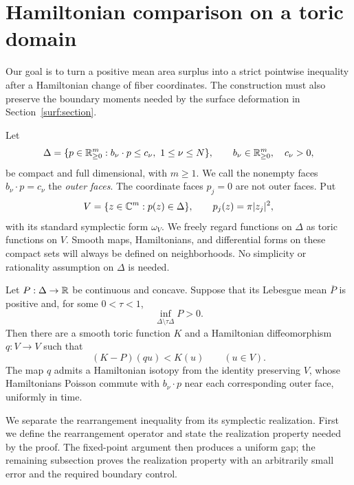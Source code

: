 \section{Hamiltonian comparison on a toric domain}\label{cmp:section}

Our goal is to turn a positive mean area surplus into a strict
pointwise inequality after a Hamiltonian change of fiber coordinates.
The construction must also preserve the boundary moments needed by
the surface deformation in Section~\ref{surf:section}.

Let
\begin{equation}\label{cmp:polytope}
 \Delta=\{p\in\mathbb R_{\ge0}^m:
             b_\nu\cdot p\le c_\nu,\ 1\le\nu\le N\},
 \qquad b_\nu\in\mathbb R_{\ge0}^m,\quad c_\nu>0,
\end{equation}
be compact and full dimensional, with \(m\ge1\).
We call the nonempty faces \(b_\nu\cdot p=c_\nu\) the
\emph{outer faces}. The coordinate faces \(p_j=0\) are not outer faces.
Put
\[
 V=\{z\in\mathbb C^m:p(z)\in\Delta\},\qquad
 p_j(z)=\pi|z_j|^2,
\]
with its standard symplectic form \(\omega_V\).
We freely regard functions on \(\Delta\) as toric functions on \(V\).
Smooth maps, Hamiltonians, and differential forms on these compact
sets will always be defined on neighborhoods. No simplicity or
rationality assumption on \(\Delta\) is needed.

\begin{lemma}\label{cmp:comparison}
Let \(P:\Delta\to\mathbb R\) be continuous and concave. Suppose that its
Lebesgue mean \(\overline P\) is positive and, for some \(0<\tau<1\),
\begin{equation}\label{cmp:outer-positive}
 \inf_{\Delta\setminus\tau\Delta}P>0.
\end{equation}
Then there are a smooth toric function \(K\) and a Hamiltonian
diffeomorphism \(q:V\to V\) such that
\begin{equation}\label{cmp:conclusion}
 (K-P)(qu)<K(u)\qquad(u\in V).
\end{equation}
The map \(q\) admits a Hamiltonian isotopy from the identity preserving
\(V\), whose Hamiltonians Poisson commute with \(b_\nu\cdot p\) near
each corresponding outer face, uniformly in time.
\end{lemma}

We separate the rearrangement inequality from its symplectic realization.
First we define the rearrangement operator and state the realization
property needed by the proof.  The fixed-point argument then produces a
uniform gap; the remaining subsection proves the realization property
with an arbitrarily small error and the required boundary control.

